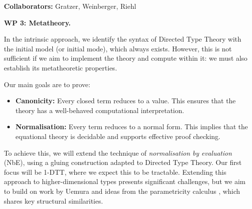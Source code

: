 \documentclass[a4paper,11pt]{article}
\renewcommand{\paragraph}[1]{\textbf{#1.}}
\begin{document}
\textbf{Collaborators:} Gratzer, Weinberger, Riehl





\paragraph{WP 3: Metatheory}

In the intrinsic approach, we identify the syntax of Directed Type
Theory with the initial model (or initial mode), which always
exists. However, this is not sufficient if we aim to implement the
theory and compute within it: we must also establish its metatheoretic
properties.

Our main goals are to prove:
\begin{itemize}
\item \textbf{Canonicity:} Every closed term reduces to a value. This
  ensures that the theory has a well-behaved computational
  interpretation.
\item \textbf{Normalisation:} Every term reduces to a normal
  form. This implies that the equational theory is decidable and
  supports effective proof checking.
\end{itemize}

To achieve this, we will extend the technique of \emph{normalisation
  by evaluation} (NbE), using a gluing construction adapted to
Directed Type Theory. Our first focus will be 1-DTT, where we expect
this to be tractable. Extending this approach to higher-dimensional
types presents significant challenges, but we aim to build on
work by Uemura \cite{uemura} and ideas 
from the parametricity calculus \cite{popl-paper}, which shares key structural
similarities.
\end{document}
